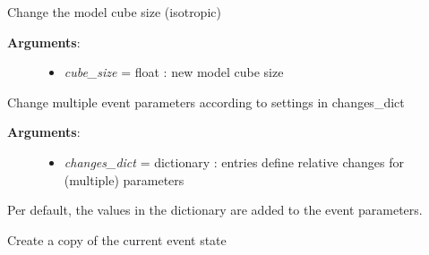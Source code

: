 \documentclass[a4paper,10pt,english]{sphinxmanual}
\begin{document}
\begin{fulllineitems}
\begin{fulllineitems}
\label{pynoddy:pynoddy.history.NoddyHistory.change_cube_size}
Change the model cube size (isotropic)
\begin{description}
\item[{\textbf{Arguments}:}] \leavevmode\begin{itemize}
\item {} 
\emph{cube\_size} = float : new model cube size

\end{itemize}

\end{description}

\end{fulllineitems}


\begin{fulllineitems}
\label{pynoddy:pynoddy.history.NoddyHistory.change_event_params}
Change multiple event parameters according to settings in changes\_dict
\begin{description}
\item[{\textbf{Arguments}:}] \leavevmode\begin{itemize}
\item {} 
\emph{changes\_dict} = dictionary : entries define relative changes for (multiple) parameters

\end{itemize}

\end{description}

Per default, the values in the dictionary are added to the event parameters.

\end{fulllineitems}


\begin{fulllineitems}
\label{pynoddy:pynoddy.history.NoddyHistory.copy_events}
Create a copy of the current event state

\end{fulllineitems}



\end{fulllineitems}
\end{document}
